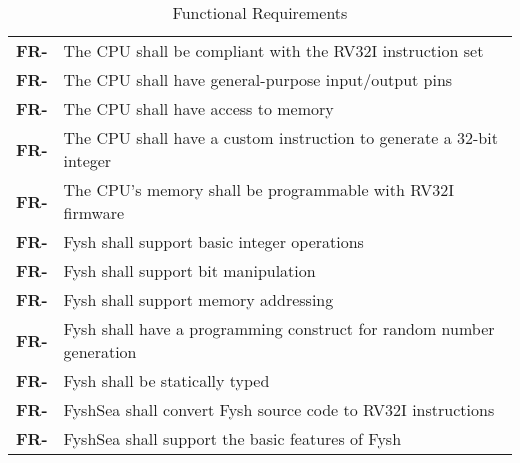 \resetfyshcounter
\newcommand{\fr}[1]{%
	\textbf{FR-\rc} & #1 \\%
	\hline%
}
\begin{table}[H]
	\begin{tabularx}{\textwidth}{| a | x |}
		\hline
		 &  \\
		\hline
		\fr{The CPU shall be compliant with the RV32I instruction set}
		\fr{The CPU shall have general-purpose input/output pins}
		\fr{The CPU shall have access to memory}
		\fr{The CPU shall have a custom instruction to generate a 32-bit integer}
		\fr{The CPU's memory shall be programmable with RV32I firmware}
		\fr{Fysh shall support basic integer operations}
		\fr{Fysh shall support bit manipulation}
		\fr{Fysh shall support memory addressing}
		\fr{Fysh shall have a programming construct for random number generation}
		\fr{Fysh shall be statically typed}
		\fr{FyshSea shall convert Fysh source code to RV32I instructions}
		\fr{FyshSea shall support the basic features of Fysh}
	\end{tabularx}
	\caption{Functional Requirements}
\end{table}

